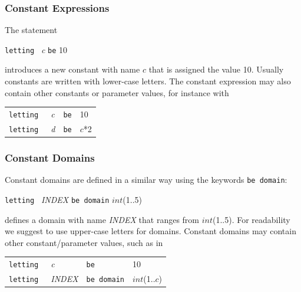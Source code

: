 \documentclass[oneside]{book}
\begin{document}
\subsubsection{Constant Expressions}
The statement
\begin{center}
{\tt letting } {\em c} {\tt be} 10
\end{center}
introduces a new constant with name $c$ that is assigned the value
10. Usually constants are written with lower-case letters. The
constant expression may also contain other constants or parameter
values, for instance with
\begin{center}
\begin{tabular}{llll}
{\tt letting } & {\em c}& {\tt be}& 10\\
{\tt letting } &{\em d} &{\tt be}& $c$*2\\
\end{tabular}
\end{center}

\subsubsection{Constant Domains}
Constant domains are defined in a similar way using 
the keywords {\tt be domain}:
\begin{center}
{\tt letting } {\em INDEX} {\tt be domain} $int$(1..5)
\end{center}
defines a domain with name {\em INDEX} that ranges 
from $int$(1..5).
For readability we suggest to use upper-case letters for domains.
 Constant domains may contain other 
constant/parameter values, such as in
\begin{center}
\begin{tabular}{llll}
{\tt letting } & {\em c}& {\tt be} &10\\
{\tt letting } &{\em INDEX}& {\tt be domain} &$int$(1..$c$) \\
\end{tabular}
\end{center}
\end{document}
